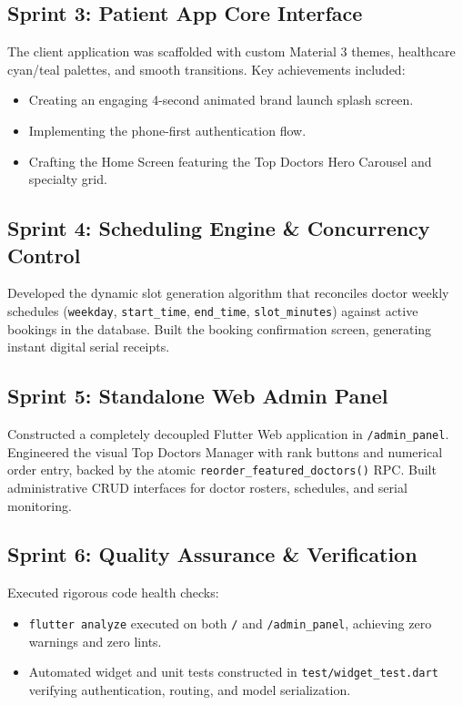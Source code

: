 \documentclass[11pt,a4paper,oneside]{report}
\begin{document}
\subsection{Sprint 3: Patient App Core Interface}
The client application was scaffolded with custom Material 3 themes, healthcare cyan/teal palettes, and smooth transitions. Key achievements included:
\begin{itemize}
    \item Creating an engaging 4-second animated brand launch splash screen.
    \item Implementing the phone-first authentication flow.
    \item Crafting the Home Screen featuring the Top Doctors Hero Carousel and specialty grid.
\end{itemize}

\subsection{Sprint 4: Scheduling Engine \& Concurrency Control}
Developed the dynamic slot generation algorithm that reconciles doctor weekly schedules (\texttt{weekday}, \texttt{start\_time}, \texttt{end\_time}, \texttt{slot\_minutes}) against active bookings in the database. Built the booking confirmation screen, generating instant digital serial receipts.

\subsection{Sprint 5: Standalone Web Admin Panel}
Constructed a completely decoupled Flutter Web application in \texttt{/admin\_panel}. Engineered the visual Top Doctors Manager with rank buttons and numerical order entry, backed by the atomic \texttt{reorder\_featured\_doctors()} RPC. Built administrative CRUD interfaces for doctor rosters, schedules, and serial monitoring.

\subsection{Sprint 6: Quality Assurance \& Verification}
Executed rigorous code health checks:
\begin{itemize}
    \item \texttt{flutter analyze} executed on both \texttt{/} and \texttt{/admin\_panel}, achieving zero warnings and zero lints.
    \item Automated widget and unit tests constructed in \texttt{test/widget\_test.dart} verifying authentication, routing, and model serialization.
\end{itemize}
\end{document}
